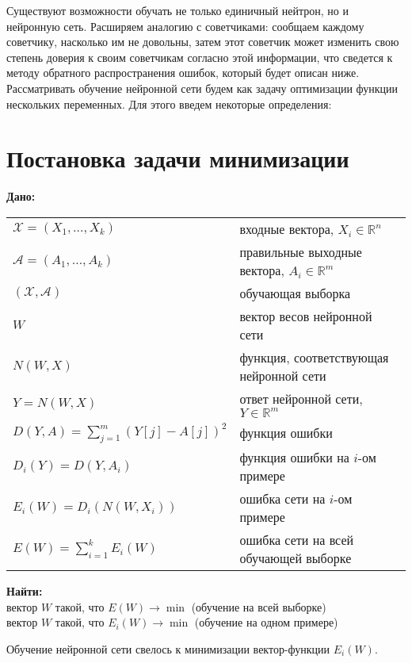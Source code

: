 \documentclass[14pt]{extreport}
\begin{document}
    Существуют возможности обучать не только единичный нейтрон, но и нейронную сеть. Расширяем аналогию с советчиками: сообщаем каждому советчику, насколько им не довольны, затем этот советчик может изменить свою степень доверия к своим советчикам согласно этой информации, что сведется к методу обратного распространения ошибок, который будет описан ниже. Рассматривать обучение нейронной сети будем как задачу оптимизации функции нескольких переменных. Для этого введем некоторые определения:
    \section{Постановка задачи минимизации}

        {\bf
            Дано:
        }

        \begin{tabular}{p{6cm} p{7.5cm}}
             $\mathcal{X}=(X_1,\ldots,X_k)$ & входные вектора, $X_i\in\mathbb{R}^n$\\[0.1cm]
             $\mathcal{A}=(A_1,\ldots,A_k)$ & правильные выходные вектора, $A_i\in\mathbb{R}^m$\\[0.1cm]
             $(\mathcal{X},\mathcal{A})$ & обучающая выборка  \\[0.1cm]
             $W$ & вектор весов нейронной сети \\[0.1cm]
             $N(W,X)$ & функция, соответствующая нейронной сети \\[0.1cm]
             $Y=N(W,X)$ & ответ нейронной сети, $Y\in\mathbb{R}^m$ \\[0.1cm]
             $D(Y,A) =\sum_{j=1}^{m} (Y[j]-A[j])^2$ & функция ошибки\\[0.1cm]
             $D_i(Y)=D(Y,A_i) $ & функция ошибки на $i$-ом примере \\[0.1cm]
              $E_i(W)=D_i(N(W,X_i))$ & ошибка сети на $i$-ом примере\\[0.1cm]
              $E(W)=\sum_{i=1}^{k}E_i(W) $ & ошибка сети на всей обучающей выборке \\[0.1cm]
         \end{tabular}

        {\bf
            Найти:
        } \\
           вектор $W$ такой, что $E(W) \rightarrow \min$ (обучение на всей выборке)\\
           вектор $W$ такой, что $E_i(W) \rightarrow \min$ (обучение на одном примере)

        \medskip
        Обучение нейронной сети свелось к минимизации вектор-функции $E_i(W)$.
\end{document}
